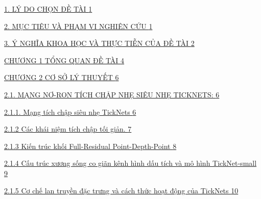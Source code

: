 \documentclass[
  12pt,
  a4paper,
]{report}
\begin{document}
\hyperref[luxfd-do-chux1ecdn-ux111ux1ec1-tuxe0i]{1. LÝ DO CHỌN ĐỀ TÀI
\hyperref[luxfd-do-chux1ecdn-ux111ux1ec1-tuxe0i]{1}}

\hyperref[mux1ee5c-tiuxeau-vuxe0-phux1ea1m-vi-nghiuxean-cux1ee9u]{2. MỤC
TIÊU VÀ PHẠM VI NGHIÊN CỨU
\hyperref[mux1ee5c-tiuxeau-vuxe0-phux1ea1m-vi-nghiuxean-cux1ee9u]{1}}

\hyperref[uxfd-nghux129a-khoa-hux1ecdc-vuxe0-thux1ef1c-tiux1ec5n-cux1ee7a-ux111ux1ec1-tuxe0i]{3.
Ý NGHĨA KHOA HỌC VÀ THỰC TIỄN CỦA ĐỀ TÀI
\hyperref[uxfd-nghux129a-khoa-hux1ecdc-vuxe0-thux1ef1c-tiux1ec5n-cux1ee7a-ux111ux1ec1-tuxe0i]{2}}

\hyperref[chux1b0ux1a1ng-1-tux1ed5ng-quan-ux111ux1ec1-tuxe0i]{CHƯƠNG 1
TỔNG QUAN ĐỀ TÀI
\hyperref[chux1b0ux1a1ng-1-tux1ed5ng-quan-ux111ux1ec1-tuxe0i]{4}}

\hyperref[chux1b0ux1a1ng-2-cux1a1-sux1edf-luxfd-thuyux1ebft]{CHƯƠNG 2 CƠ
SỞ LÝ THUYẾT
\hyperref[chux1b0ux1a1ng-2-cux1a1-sux1edf-luxfd-thuyux1ebft]{6}}

\hyperref[mux1ea1ng-nux1a1-ron-tuxedch-chux1eadp-nhux1eb9-siuxeau-nhux1eb9-ticknets]{2.1.
MẠNG NƠ-RON TÍCH CHẬP NHẸ SIÊU NHẸ TICKNETS:
\hyperref[mux1ea1ng-nux1a1-ron-tuxedch-chux1eadp-nhux1eb9-siuxeau-nhux1eb9-ticknets]{6}}

\hyperref[mux1ea1ng-tuxedch-chux1eadp-siuxeau-nhux1eb9-ticknets]{2.1.1.
Mạng tích chập siêu nhẹ TickNets
\hyperref[mux1ea1ng-tuxedch-chux1eadp-siuxeau-nhux1eb9-ticknets]{6}}

\hyperref[cuxe1c-khuxe1i-niux1ec7m-tuxedch-chux1eadp-tux1ed1i-giux1ea3n.]{2.1.2
Các khái niệm tích chập tối giản.
\hyperref[cuxe1c-khuxe1i-niux1ec7m-tuxedch-chux1eadp-tux1ed1i-giux1ea3n.]{7}}

\hyperref[kiux1ebfn-truxfac-khux1ed1i-full-residual-point-depth-point]{2.1.3
Kiến trúc khối Full-Residual Point-Depth-Point
\hyperref[kiux1ebfn-truxfac-khux1ed1i-full-residual-point-depth-point]{8}}

\hyperref[cux1ea5u-truxfac-xux1b0ux1a1ng-sux1ed1ng-co-giuxe3n-kuxeanh-huxecnh-dux1ea5u-tuxedch-vuxe0-muxf4-huxecnh-ticknet-small]{2.1.4
Cấu trúc xương sống co giãn kênh hình dấu tích và mô hình TickNet-small
\hyperref[cux1ea5u-truxfac-xux1b0ux1a1ng-sux1ed1ng-co-giuxe3n-kuxeanh-huxecnh-dux1ea5u-tuxedch-vuxe0-muxf4-huxecnh-ticknet-small]{9}}

\hyperref[cux1a1-chux1ebf-lan-truyux1ec1n-ux111ux1eb7c-trux1b0ng-vuxe0-cuxe1ch-thux1ee9c-houx1ea1t-ux111ux1ed9ng-cux1ee7a-ticknets]{2.1.5
Cơ chế lan truyền đặc trưng và cách thức hoạt động của TickNets
\hyperref[cux1a1-chux1ebf-lan-truyux1ec1n-ux111ux1eb7c-trux1b0ng-vuxe0-cuxe1ch-thux1ee9c-houx1ea1t-ux111ux1ed9ng-cux1ee7a-ticknets]{10}}
\end{document}
